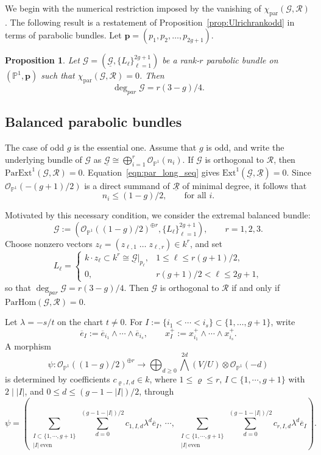 \documentclass[12pt, letterpaper]{amsart}
\newtheorem{proposition}[theorem]{Proposition}
\theoremstyle{definition}
\newcommand{\PP}{\mathbb{P} }
\newcommand{\cG}{\mathcal{G} }
\newcommand{\cO}{\mathcal{O} }
\newcommand{\cR}{\mathcal{R} }
\newcommand{\bp}{\mathbf{p} }
\newcommand{\lbd}{\lambda}
\newcommand{\pHom}{\mathrm{ParHom}}
\newcommand{\rpar}{\mathrm{par}}
\newcommand{\pardeg}{\deg_{par}}
\def\Ext{\mathrm{Ext} }
\def\pExt{\mathrm{ParExt} }
\begin{document}
We begin with the numerical restriction imposed by the vanishing of \(\chi_{\rpar}(\cG,\cR)\). The following result is a restatement of Proposition~\ref{prop:Ulrichrankodd} in terms of parabolic bundles. Let \(\bp = (p_1, p_2, \dots, p_{2g+1})\).

\begin{proposition}\label{prop:chi_condition}
Let \( \cG=(\underline{\cG},\{L_\ell\}_{\ell=1}^{2g+1}) \) be a rank-\(r\) parabolic bundle on \((\PP^1, \bp)\) such that \(\chi_{\rpar}(\cG, \cR) = 0\). Then
\[\pardeg \cG = r(3-g)/4.\]
\end{proposition}

\subsection{Balanced parabolic bundles}\label{ssec:balancedparabolic}

The case of odd \(g\) is the essential one. Assume that \(g\) is odd, and write the underlying bundle of \(\cG\) as \(\underline{\cG}\cong \bigoplus_{i=1}^r \cO_{\PP^1}(n_i)\). If \(\cG\) is orthogonal to \(\cR\), then \(\pExt^1(\cG, \cR) = 0\). Equation~\eqref{eqn:par_long_seq} gives \(\Ext^1(\underline{\cG},\underline{\cR})=0\). Since \(\cO_{\PP^1}\!\left(-(g+1)/2\right)\) is a direct summand of \(\underline{\cR}\) of minimal degree, it follows that
\[n_i\le (1-g)/2, \qquad\text{for all }i.\]

Motivated by this necessary condition, we consider the extremal balanced bundle:
\begin{equation}\label{eqn:extbalbdl}
\cG:=\left(\cO_{\PP^1}\!\left((1-g)/2\right)^{\oplus r},\{L_\ell\}_{\ell=1}^{2g+1}\right),\qquad r=1,2,3.
\end{equation}
Choose nonzero vectors \(z_\ell=(z_{\ell,1}\;\dots\;z_{\ell,r})\in k^r\), and set
\[
L_\ell= \begin{cases}
  k\cdot z_\ell\subset k^r\cong \underline{\cG}|_{p_\ell}, & 1\le\ell\le r(g+1)/2,\\[4pt]
  0, & r(g+1)/2<\ell\le 2g+1,
\end{cases}
\]
so that \(\pardeg\cG=r(3-g)/4\). Then \(\cG\) is orthogonal to \(\cR\) if and only if \(\pHom(\cG,\cR)=0\).

Let \(\lbd=-s/t\) on the chart \(t\ne0\). For \(I:=\{i_1<\cdots<i_s\}\subset\{1,\dots,g+1\}\), write
\[\overline e_I:=\overline e_{i_1}\wedge\cdots\wedge\overline e_{i_s},\qquad x_I^+:=x_{i_1}^+\wedge\cdots\wedge x_{i_s}^+.\]
A morphism
\[\psi:\cO_{\PP^1}\!\left((1-g)/2\right)^{\oplus r}\longrightarrow\bigoplus_{d\ge0}\bigwedge^{2d}(V/U)\otimes \cO_{\PP^1}(-d)\]
is determined by coefficients \(c_{\varrho,I,d}\in k\), where \(1\le\varrho\le r\), \(I\subset\{1,\cdots,g+1\}\) with \(2\mid |I|\), and \(0\le d\le (g-1-|I|)/2\), through
\[
\psi=\left(\sum_{\substack{I\subset\{1,\cdots,g+1\}\\|I|\ \mathrm{even}}}\sum_{d=0}^{(g-1-|I|)/2}c_{1,I,d}\lbd^d\overline e_I,\ \cdots,\ \sum_{\substack{I\subset\{1,\cdots,g+1\}\\|I|\ \mathrm{even}}}\sum_{d=0}^{(g-1-|I|)/2}c_{r,I,d}\lbd^d\overline e_I\right).
\]
\end{document}
